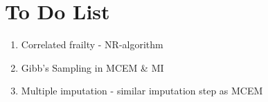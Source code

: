 \documentclass[preprint,12pt]{elsarticle}
\begin{document}
\begin{frontmatter}





\end{frontmatter}

\linenumbers
\section{To Do List}
\begin{enumerate}
    \item Correlated frailty - NR-algorithm
    \item Gibb's Sampling in MCEM \& MI
    \item Multiple imputation - similar imputation step as MCEM
\end{enumerate}
\end{document}
